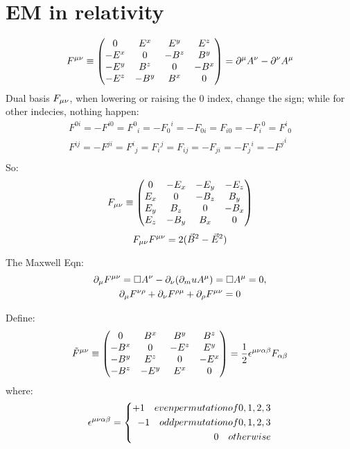 \section{EM in relativity}

\begin{equation}
    F^{\mu\nu} \equiv 
	\begin{pmatrix}
	    0	& E^x	& E^y	& E^z	\\
	    -E^x    & 0	& -B^z	& B^y	\\
	    -E^y    & B^z   & 0	& -B^x	\\
	    -E^z    & -B^y  & B^x   & 0	\\
	\end{pmatrix}
	= \partial^\mu A^\nu - \partial^\nu A^\mu
\end{equation}
Dual basis $F_{\mu\nu}$, when lowering or raising the 0 index, change the sign; while
for other indecies, nothing happen:
\[
    \begin{aligned}
    F^{0i} = -F^{i0} = {F^0}_i = -{F_0}^i = -F_{0i} =  F_{i0} = -{F_i}^0 = {F^i}_0   \\
    F^{ij} = -F^{ji} = {F^i}_j =  {F_i}^j =  F_{ij} = -F_{ji} = -{F_j}^i = -{F^j}^i \\
    \end{aligned}
\]
So:
\begin{equation}
    F_{\mu\nu} \equiv 
	\begin{pmatrix}
	    0	& -E_x	& -E_y	& -E_z	\\
	    E_x    & 0	& -B_z	& B_y	\\
	    E_y    & B_z   & 0	& -B_x	\\
	    E_z    & -B_y  & B_x   & 0	\\
	\end{pmatrix}
\end{equation}
\[
    F_{\mu\nu}F^{\mu\nu} = 2(\vec{B}^2 - \vec{E}^2)
\]

The Maxwell Eqn:
\begin{gather}
    \partial_\mu F^{\mu\nu} = \Box A^\nu - \partial_\nu(\partial_mu A^\mu) =
    \Box A^\mu = 0, \notag\\
    \partial_\mu F^{\nu\rho} + \partial_\nu F^{\rho\mu} + \partial_\rho F^{\mu\nu} = 0
\end{gather}

Define:
\begin{equation}
    \tilde{F}^{\mu\nu} \equiv 
	\begin{pmatrix}
	    0	& B^x	& B^y	& B^z	\\
	    -B^x    & 0	& -E^z	& E^y	\\
	    -B^y    & E^z   & 0	& -E^x	\\
	    -B^z    & -E^y  & E^x   & 0	\\
	\end{pmatrix} 
	= \frac{1}{2}\epsilon^{\mu\nu\alpha\beta}F_{\alpha\beta}
\end{equation}
where:
\[
    \epsilon^{\mu\nu\alpha\beta} = 
    \left\{ 
	\begin{aligned}
	    +1	\quad	even permutation of 0, 1, 2, 3	\\
	    -1	\quad	odd permutation of 0, 1, 2, 3	\\
	    0	\quad	otherwise
	\end{aligned}
	\right.
\]

